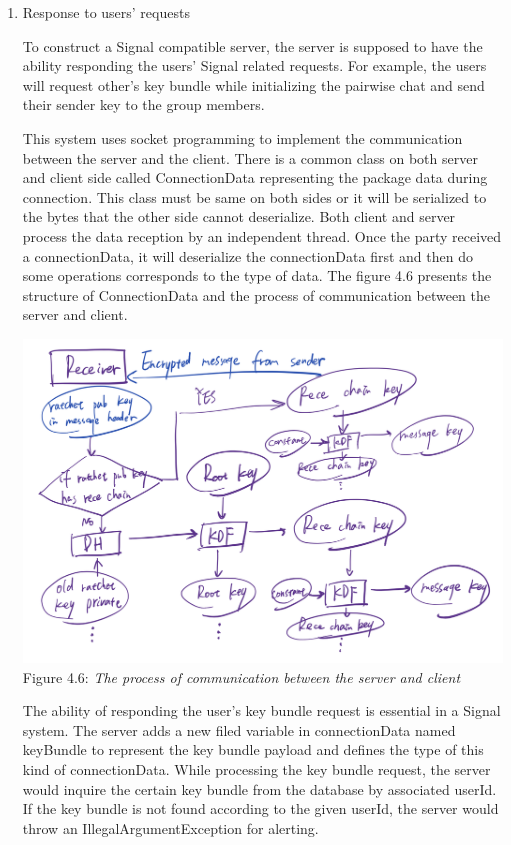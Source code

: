 \begin{enumerate}[label=(\roman*)]
\item Response to users' requests

To construct a Signal compatible server, the server is supposed to have the ability responding the users' Signal related requests. For example, the users will request other's key bundle while initializing the pairwise chat and send their sender key to the group members.

This system uses socket programming to implement the communication between the server and the client. There is a common class on both server and client side called ConnectionData representing the package data during connection. This class must be same on both sides or it will be serialized to the bytes that the other side cannot deserialize. Both client and server process the data reception by an independent thread. Once the party received a connectionData, it will deserialize the connectionData first and then do some operations corresponds to the type of data. The figure 4.6 presents the structure of ConnectionData and the process of communication between the server and client.

\begin{center}
\includegraphics[scale=.5]{../3-Background/resources/DH-rece.png}\\
Figure 4.6: \textit{The process of communication between the server and client}
\end{center}

The ability of responding the user's key bundle request is essential in a Signal system. The server adds a new filed variable in connectionData named keyBundle to represent the key bundle payload and defines the type of this kind of connectionData. While processing the key bundle request, the server would inquire the certain key bundle from the database by associated userId. If the key bundle is not found according to the given userId, the server would throw an IllegalArgumentException for alerting.


\end{enumerate}
